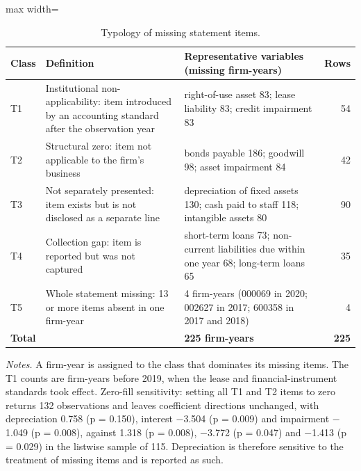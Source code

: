 \documentclass[review,3p,times]{elsarticle}
\begin{document}
\begin{table}[!htbp]
\centering
\renewcommand{\thetable}{A6}
\caption{Typology of missing statement items.}\label{tab:A6}
\begin{minipage}{\textwidth}
\centering
\footnotesize
\begin{adjustbox}{max width=\textwidth}
\begin{tabular}{@{}lllr@{}}
\toprule
Class & Definition & Representative variables (missing firm-years) & Rows \\
\midrule
T1 & Institutional non-applicability: item introduced by an accounting standard after the observation year & right-of-use asset 83; lease liability 83; credit impairment 83 & 54 \\
T2 & Structural zero: item not applicable to the firm's business & bonds payable 186; goodwill 98; asset impairment 84 & 42 \\
T3 & Not separately presented: item exists but is not disclosed as a separate line & depreciation of fixed assets 130; cash paid to staff 118; intangible assets 80 & 90 \\
T4 & Collection gap: item is reported but was not captured & short-term loans 73; non-current liabilities due within one year 68; long-term loans 65 & 35 \\
T5 & Whole statement missing: 13 or more items absent in one firm-year & 4 firm-years (000069 in 2020; 002627 in 2017; 600358 in 2017 and 2018) & 4 \\
\textbf{Total} &  & \textbf{225 firm-years} & \textbf{225} \\
\bottomrule
\end{tabular}
\end{adjustbox}
\par\medskip
\raggedright
\noindent\textit{Notes.} A firm-year is assigned to the class that dominates its missing items. The T1 counts are firm-years before 2019, when the lease and financial-instrument standards took effect. Zero-fill sensitivity: setting all T1 and T2 items to zero returns 132 observations and leaves coefficient directions unchanged, with depreciation 0.758 (p = 0.150), interest \ensuremath{-}3.504 (p = 0.009) and impairment \ensuremath{-}1.049 (p = 0.008), against 1.318 (p = 0.008), \ensuremath{-}3.772 (p = 0.047) and \ensuremath{-}1.413 (p = 0.029) in the listwise sample of 115. Depreciation is therefore sensitive to the treatment of missing items and is reported as such.
\end{minipage}
\end{table}
\end{document}
